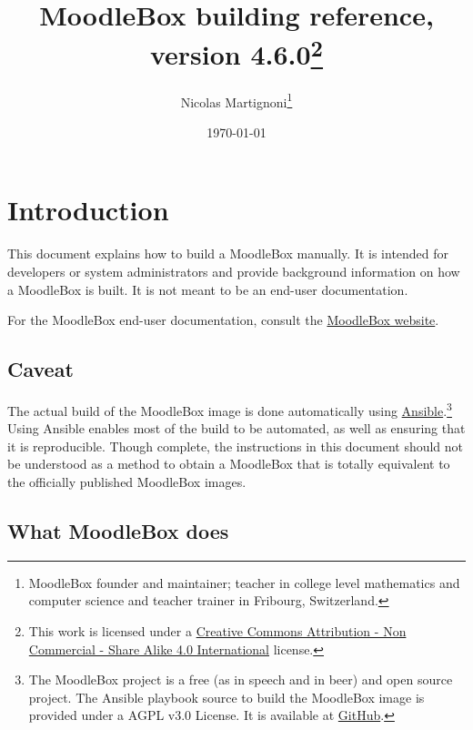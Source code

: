 \documentclass[12pt]{article}
\begin{document}
\title{MoodleBox building reference, version 4.6.0\footnote{This work is licensed under a \href{http://creativecommons.org/licenses/by-nc-sa/4.0/}{Creative Commons Attribution - Non Commercial - Share Alike  4.0 International} license.}}
\date{\today} %
\author{Nicolas Martignoni\footnote{MoodleBox founder and maintainer; teacher in college level mathematics and computer science and teacher trainer in Fribourg, Switzerland.}}
\maketitle

\begingroup
\setlength{\parskip}{3pt plus1pt minus1pt}
\tableofcontents
\endgroup
\clearpage

\section{Introduction}

This document explains how to build a MoodleBox manually.
It is intended for developers or system administrators and provide background information on how a MoodleBox is built.
It is not meant to be an end-user documentation.

For the MoodleBox end-user documentation, consult the \href{https://moodlebox.net/}{MoodleBox website}.

\subsection{Caveat}

The actual build of the MoodleBox image is done automatically using \href{https://www.ansible.com/}{Ansible}.\footnote{The MoodleBox project is a free (as in speech and in beer) and open source project. The Ansible playbook source to build the MoodleBox image is provided under a AGPL v3.0 License. It is available at \href{https://github.com/moodlebox/moodlebox}{GitHub}.}
Using Ansible enables most of the build to be automated, as well as ensuring that it is reproducible.
Though complete, the instructions in this document should not be understood as a method to obtain a MoodleBox that is totally equivalent to the officially published MoodleBox images.

\subsection{What MoodleBox does}
\end{document}
